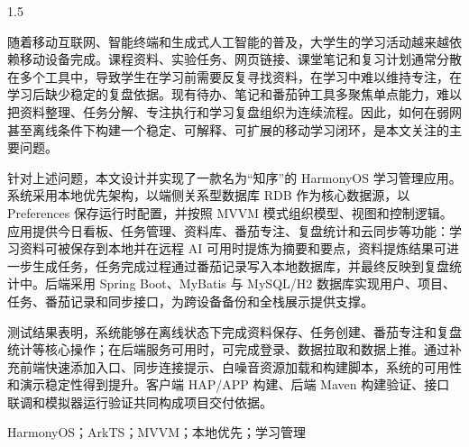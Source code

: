 
\begin{zhaiyao}
\begin{spacing}{1.5}
{
随着移动互联网、智能终端和生成式人工智能的普及，大学生的学习活动越来越依赖移动设备完成。课程资料、实验任务、网页链接、课堂笔记和复习计划通常分散在多个工具中，导致学生在学习前需要反复寻找资料，在学习中难以维持专注，在学习后缺少稳定的复盘依据。现有待办、笔记和番茄钟工具多聚焦单点能力，难以把资料整理、任务分解、专注执行和学习复盘组织为连续流程。因此，如何在弱网甚至离线条件下构建一个稳定、可解释、可扩展的移动学习闭环，是本文关注的主要问题。

针对上述问题，本文设计并实现了一款名为“知序”的 HarmonyOS 学习管理应用。系统采用本地优先架构，以端侧关系型数据库 RDB 作为核心数据源，以 Preferences 保存运行时配置，并按照 MVVM 模式组织模型、视图和控制逻辑。应用提供今日看板、任务管理、资料库、番茄专注、复盘统计和云同步等功能：学习资料可被保存到本地并在远程 AI 可用时提炼为摘要和要点，资料提炼结果可进一步生成任务，任务完成过程通过番茄记录写入本地数据库，并最终反映到复盘统计中。后端采用 Spring Boot、MyBatis 与 MySQL/H2 数据库实现用户、项目、任务、番茄记录和同步接口，为跨设备备份和全栈展示提供支撑。

测试结果表明，系统能够在离线状态下完成资料保存、任务创建、番茄专注和复盘统计等核心操作；在后端服务可用时，可完成登录、数据拉取和数据上推。通过补充前端快速添加入口、同步连接提示、白噪音资源加载和构建脚本，系统的可用性和演示稳定性得到提升。客户端 HAP/APP 构建、后端 Maven 构建验证、接口联调和模拟器运行验证共同构成项目交付依据。
}
\end{spacing}
\end{zhaiyao}

\begin{guanjianci}
HarmonyOS；ArkTS；MVVM；本地优先；学习管理
\end{guanjianci}

